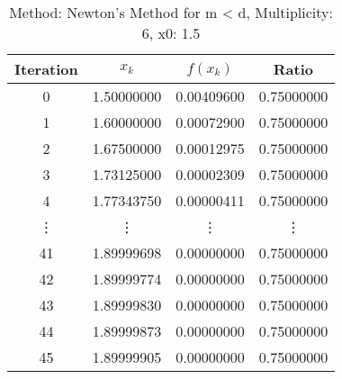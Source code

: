 \begin{table}
\centering
\caption{Method: Newton's Method for m < d, Multiplicity: 6, x0: 1.5}
\label{tab:table_Newton's_Method_for_m_<_d_6_1_5}
\begin{tabular}{c c c c}
\toprule
Iteration &      $x_k$ &   $f(x_k)$ &      Ratio \\
\midrule
        0 & 1.50000000 & 0.00409600 & 0.75000000 \\
        1 & 1.60000000 & 0.00072900 & 0.75000000 \\
        2 & 1.67500000 & 0.00012975 & 0.75000000 \\
        3 & 1.73125000 & 0.00002309 & 0.75000000 \\
        4 & 1.77343750 & 0.00000411 & 0.75000000 \\
   \vdots &     \vdots &     \vdots &     \vdots \\
       41 & 1.89999698 & 0.00000000 & 0.75000000 \\
       42 & 1.89999774 & 0.00000000 & 0.75000000 \\
       43 & 1.89999830 & 0.00000000 & 0.75000000 \\
       44 & 1.89999873 & 0.00000000 & 0.75000000 \\
       45 & 1.89999905 & 0.00000000 & 0.75000000 \\
\bottomrule
\end{tabular}
\end{table}
